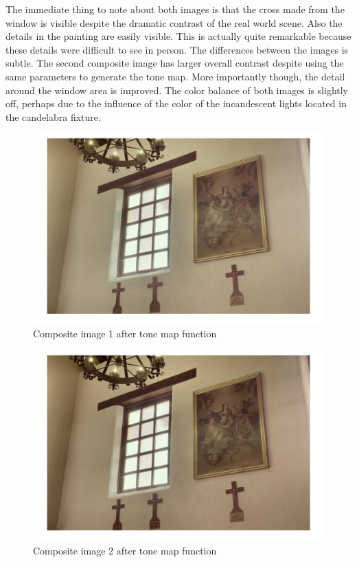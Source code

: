\documentclass[a4paper]{article}
\begin{document}
The immediate thing to note about both images is that the cross made from the window is  visible despite the dramatic contrast of the real world scene.  Also the details in the painting are easily visible. This is actually quite remarkable because these details were difficult to see in person.  The differences between the images is subtle.  The second composite image has larger overall contrast despite using the same parameters to generate the tone map.  More importantly though, the detail around the window area is improved.  The color balance of both images is slightly off, perhaps due to the influence of the color of the incandescent lights located in the candelabra fixture.  
\begin{figure}[htb!]
    \begin{center}
        \includegraphics[width=6 in]{comp1LDR.jpg}
	 \end{center}
    \caption{Composite image 1 after tone map function} 
    \label{fig:LDR1}
\end{figure}

\begin{figure}[htb!]
    \begin{center}
        \includegraphics[width=6 in]{comp2LDR.jpg}
	 \end{center}
    \caption{Composite image 2 after tone map function} 
    \label{fig:LDR2}
\end{figure}
\FloatBarrier
\end{document}
